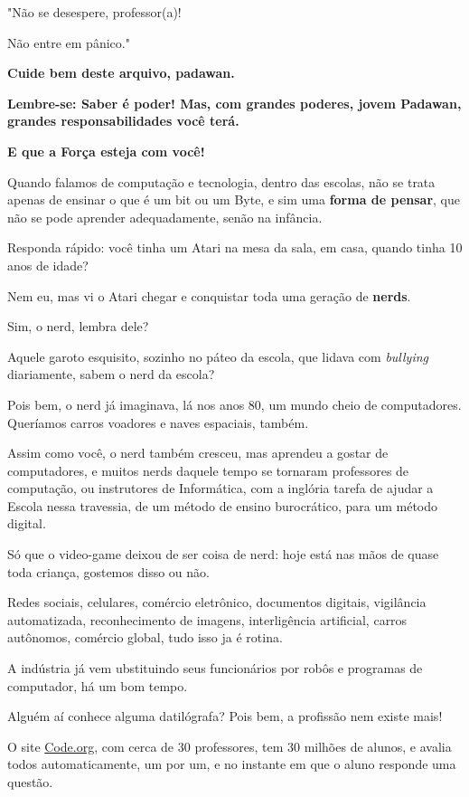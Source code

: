 \begin{multicols}{2}
"Não se desespere, professor(a)!

Não entre em pânico."

\textbf{Cuide bem deste arquivo, padawan.}

\textbf{Lembre-se: Saber é poder! Mas, com grandes poderes, jovem Padawan, grandes responsabilidades você terá.}
	
\textbf{E que a Força esteja com você!}

\vfill 
\columnbreak

Quando falamos de computação e tecnologia, dentro das escolas, não se trata apenas de ensinar o que é um bit ou um Byte, e sim uma \textbf{forma de pensar}, que não se pode aprender adequadamente, senão na infância.

Responda rápido: você tinha um Atari na mesa da sala, em casa, quando tinha 10 anos de idade?

Nem eu, mas vi o Atari chegar e conquistar toda uma geração de \textbf{nerds}.

Sim, o nerd, lembra dele?

Aquele garoto esquisito, sozinho no páteo da escola, que lidava com \textit{bullying} diariamente, sabem o nerd da escola?

Pois bem, o nerd já imaginava, lá nos anos 80, um mundo cheio de computadores. Queríamos carros voadores e naves espaciais, também.

Assim como você, o nerd também cresceu, mas aprendeu a gostar de computadores, e muitos nerds daquele tempo se tornaram professores de computação, ou instrutores de Informática, com a inglória tarefa de ajudar a Escola nessa travessia, de um método de ensino burocrático, para um método digital.

Só que o video-game deixou de ser coisa de nerd: hoje está nas mãos de quase toda criança, gostemos disso ou não.

Redes sociais, celulares, comércio eletrônico, documentos digitais, vigilância automatizada, reconhecimento de imagens, interligência artificial, carros autônomos, comércio global, tudo isso ja é rotina.

A indústria já vem ubstituindo seus funcionários por robôs e programas de computador, há um bom tempo.

Alguém aí conhece alguma datilógrafa? Pois bem, a profissão nem existe mais!

O site \href{www.code.org}{Code.org}, com cerca de 30 professores, tem 30 milhões de alunos, e avalia todos automaticamente, um por um, e no instante em que o aluno responde uma questão.


\end{multicols}
